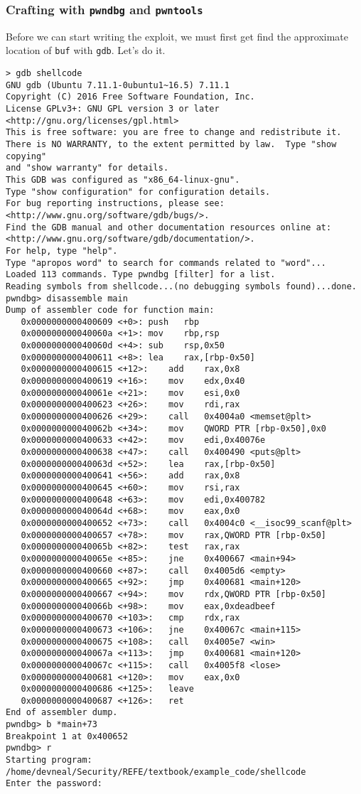 \documentclass{article}
\begin{document}
\subsubsection{Crafting with \texttt{pwndbg} and \texttt{pwntools}}
Before we can start writing the exploit, we must first get find the approximate
location of \texttt{buf} with \texttt{gdb}. Let's do it.

\begin{lstlisting}
> gdb shellcode
GNU gdb (Ubuntu 7.11.1-0ubuntu1~16.5) 7.11.1
Copyright (C) 2016 Free Software Foundation, Inc.
License GPLv3+: GNU GPL version 3 or later <http://gnu.org/licenses/gpl.html>
This is free software: you are free to change and redistribute it.
There is NO WARRANTY, to the extent permitted by law.  Type "show copying"
and "show warranty" for details.
This GDB was configured as "x86_64-linux-gnu".
Type "show configuration" for configuration details.
For bug reporting instructions, please see:
<http://www.gnu.org/software/gdb/bugs/>.
Find the GDB manual and other documentation resources online at:
<http://www.gnu.org/software/gdb/documentation/>.
For help, type "help".
Type "apropos word" to search for commands related to "word"...
Loaded 113 commands. Type pwndbg [filter] for a list.
Reading symbols from shellcode...(no debugging symbols found)...done.
pwndbg> disassemble main
Dump of assembler code for function main:
   0x0000000000400609 <+0>:	push   rbp
   0x000000000040060a <+1>:	mov    rbp,rsp
   0x000000000040060d <+4>:	sub    rsp,0x50
   0x0000000000400611 <+8>:	lea    rax,[rbp-0x50]
   0x0000000000400615 <+12>:	add    rax,0x8
   0x0000000000400619 <+16>:	mov    edx,0x40
   0x000000000040061e <+21>:	mov    esi,0x0
   0x0000000000400623 <+26>:	mov    rdi,rax
   0x0000000000400626 <+29>:	call   0x4004a0 <memset@plt>
   0x000000000040062b <+34>:	mov    QWORD PTR [rbp-0x50],0x0
   0x0000000000400633 <+42>:	mov    edi,0x40076e
   0x0000000000400638 <+47>:	call   0x400490 <puts@plt>
   0x000000000040063d <+52>:	lea    rax,[rbp-0x50]
   0x0000000000400641 <+56>:	add    rax,0x8
   0x0000000000400645 <+60>:	mov    rsi,rax
   0x0000000000400648 <+63>:	mov    edi,0x400782
   0x000000000040064d <+68>:	mov    eax,0x0
   0x0000000000400652 <+73>:	call   0x4004c0 <__isoc99_scanf@plt>
   0x0000000000400657 <+78>:	mov    rax,QWORD PTR [rbp-0x50]
   0x000000000040065b <+82>:	test   rax,rax
   0x000000000040065e <+85>:	jne    0x400667 <main+94>
   0x0000000000400660 <+87>:	call   0x4005d6 <empty>
   0x0000000000400665 <+92>:	jmp    0x400681 <main+120>
   0x0000000000400667 <+94>:	mov    rdx,QWORD PTR [rbp-0x50]
   0x000000000040066b <+98>:	mov    eax,0xdeadbeef
   0x0000000000400670 <+103>:	cmp    rdx,rax
   0x0000000000400673 <+106>:	jne    0x40067c <main+115>
   0x0000000000400675 <+108>:	call   0x4005e7 <win>
   0x000000000040067a <+113>:	jmp    0x400681 <main+120>
   0x000000000040067c <+115>:	call   0x4005f8 <lose>
   0x0000000000400681 <+120>:	mov    eax,0x0
   0x0000000000400686 <+125>:	leave  
   0x0000000000400687 <+126>:	ret    
End of assembler dump.
pwndbg> b *main+73
Breakpoint 1 at 0x400652
pwndbg> r
Starting program: /home/devneal/Security/REFE/textbook/example_code/shellcode 
Enter the password:


\end{lstlisting}
\end{document}
